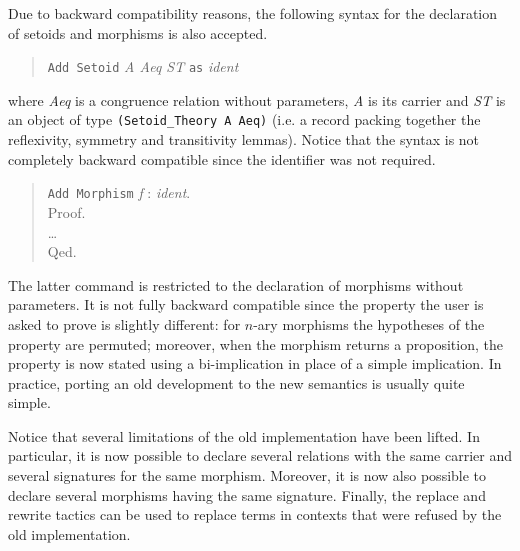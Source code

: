 Due to backward compatibility reasons, the following syntax for the
declaration of setoids and morphisms is also accepted.

\begin{verse}
  \texttt{Add Setoid} \textit{A Aeq ST} \texttt{as} \textit{ident}
\end{verse}
where \textit{Aeq} is a congruence relation without parameters,
\textit{A} is its carrier and \textit{ST} is an object of type
\verb|(Setoid_Theory A Aeq)| (i.e. a record packing together the reflexivity,
symmetry and transitivity lemmas). Notice that the syntax is not completely
backward compatible since the identifier was not required.

\begin{verse}
  \texttt{Add Morphism} \textit{ f }:\textit{ ident}.\\
  Proof.\\
  \ldots\\
  Qed.
\end{verse}

The latter command is restricted to the declaration of morphisms without
parameters. It is not fully backward compatible since the property the user
is asked to prove is slightly different: for $n$-ary morphisms the hypotheses
of the property are permuted; moreover, when the morphism returns a
proposition, the property is now stated using a bi-implication in place of
a simple implication. In practice, porting an old development to the new
semantics is usually quite simple.

Notice that several limitations of the old implementation have been lifted.
In particular, it is now possible to declare several relations with the
same carrier and several signatures for the same morphism. Moreover, it is
now also possible to declare several morphisms having the same signature.
Finally, the replace and rewrite tactics can be used to replace terms in
contexts that were refused by the old implementation.


